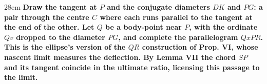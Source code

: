 \documentclass[border=4pt]{standalone}
\begin{document}
\begin{varwidth}{28em}
\large\bfseries
Draw the tangent at $P$ and the \textcolor{parteal}{conjugate diameters $DK$ and $PG$}: a      pair through the centre $C$ where each runs parallel to the tangent at the end      of the other. Let $Q$ be a body-point near $P$, with the ordinate $Qv$ dropped      to the diameter $PG$, and complete the \textcolor{parteal}{parallelogram $QxPR$}. This is      the ellipse's version of the $QR$ construction of Prop. VI, whose nascent limit      measures the deflection. By Lemma VII the \textcolor{radgreen}{chord $SP$} and its tangent      coincide in the ultimate ratio, licensing this passage to the limit.
\end{varwidth}
\end{document}
